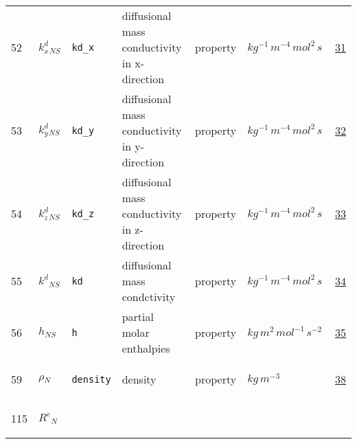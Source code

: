 \begin{longtable}{|p{1cm}|p{2.5cm}|p{4.5cm}|p{8cm}|p{3.0cm}|p{3cm}|p{1cm}|}
                 \\
    52
             & \hypertarget{"v:52"}{ $ {{k^d_x}}{_{{N S}}} $}
             & \verb|kd_x|
             & diffusional mass conductivity in x-direction
             & \begin{lay}property \end{lay}
             & $ kg^{-1} \,m^{-4} \,mol^{2} \,s \, $
             & \hyperlink{"e:31"}{ 31 }
                 \\
    53
             & \hypertarget{"v:53"}{ $ {{k^d_y}}{_{{N S}}} $}
             & \verb|kd_y|
             & diffusional mass conductivity in y-direction
             & \begin{lay}property \end{lay}
             & $ kg^{-1} \,m^{-4} \,mol^{2} \,s \, $
             & \hyperlink{"e:32"}{ 32 }
                 \\
    54
             & \hypertarget{"v:54"}{ $ {{k^d_z}}{_{{N S}}} $}
             & \verb|kd_z|
             & diffusional mass conductivity in z-direction
             & \begin{lay}property \end{lay}
             & $ kg^{-1} \,m^{-4} \,mol^{2} \,s \, $
             & \hyperlink{"e:33"}{ 33 }
                 \\
    55
             & \hypertarget{"v:55"}{ $ {{k^d}}{_{{N S}}} $}
             & \verb|kd|
             & diffusional mass condctivity
             & \begin{lay}property \end{lay}
             & $ kg^{-1} \,m^{-4} \,mol^{2} \,s \, $
             & \hyperlink{"e:34"}{ 34 }
                 \\
    56
             & \hypertarget{"v:56"}{ $ {h}{_{{N S}}} $}
             & \verb|h|
             & partial molar enthalpies
             & \begin{lay}property \end{lay}
             & $ kg \,m^{2} \,mol^{-1} \,s^{-2} \, $
             & \hyperlink{"e:35"}{ 35 }
                 \\
    59
             & \hypertarget{"v:59"}{ $ {\rho}{_{N}} $}
             & \verb|density|
             & density
             & \begin{lay}property \end{lay}
             & $ kg \,m^{-3} \, $
             & \hyperlink{"e:38"}{ 38 }
                 \\
    115
             & \hypertarget{"v:115"}{ $ {{R^e}}{_{N}} $}

\end{longtable}
